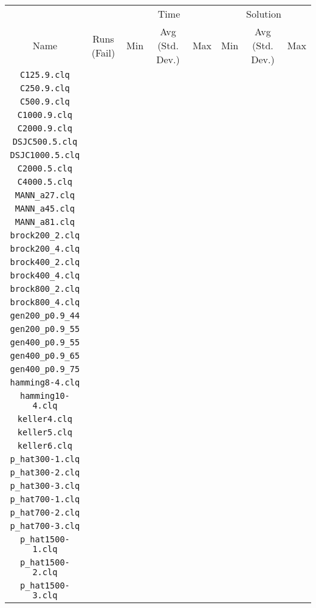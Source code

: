 %
%
\begin{tabular}[htbp]{c|c|ccc|ccc}
  &    &\multicolumn{3}{c|}{Time}&\multicolumn{3}{c}{Solution}\\
Name       &Runs (Fail)&Min&Avg (Std. Dev.)&Max&Min&Avg (Std. Dev.)&Max\\\hline
{\tt C125.9.clq}& & & & & & & \\
{\tt C250.9.clq}& & & & & & & \\
{\tt C500.9.clq}& & & & & & & \\
{\tt C1000.9.clq}& & & & & & & \\
{\tt C2000.9.clq}& & & & & & & \\
{\tt DSJC500.5.clq}& & & & & & & \\
{\tt DSJC1000.5.clq}& & & & & & & \\
{\tt C2000.5.clq}& & & & & & & \\
{\tt C4000.5.clq}& & & & & & & \\
{\tt MANN\_a27.clq}& & & & & & & \\
{\tt MANN\_a45.clq}& & & & & & & \\
{\tt MANN\_a81.clq}& & & & & & & \\
{\tt brock200\_2.clq}& & & & & & & \\
{\tt brock200\_4.clq}& & & & & & & \\
{\tt brock400\_2.clq}& & & & & & & \\
{\tt brock400\_4.clq}& & & & & & & \\
{\tt brock800\_2.clq}& & & & & & & \\
{\tt brock800\_4.clq}& & & & & & & \\
{\tt gen200\_p0.9\_44}& & & & & & & \\
{\tt gen200\_p0.9\_55}& & & & & & & \\
{\tt gen400\_p0.9\_55}& & & & & & & \\
{\tt gen400\_p0.9\_65}& & & & & & & \\
{\tt gen400\_p0.9\_75}& & & & & & & \\
{\tt hamming8-4.clq}& & & & & & & \\
{\tt hamming10-4.clq}& & & & & & & \\
{\tt keller4.clq}& & & & & & & \\
{\tt keller5.clq}& & & & & & & \\
{\tt keller6.clq}& & & & & & & \\
{\tt p\_hat300-1.clq}& & & & & & & \\
{\tt p\_hat300-2.clq}& & & & & & & \\
{\tt p\_hat300-3.clq}& & & & & & & \\
{\tt p\_hat700-1.clq}& & & & & & & \\
{\tt p\_hat700-2.clq}& & & & & & & \\
{\tt p\_hat700-3.clq}& & & & & & & \\
{\tt p\_hat1500-1.clq}& & & & & & & \\
{\tt p\_hat1500-2.clq}& & & & & & & \\
{\tt p\_hat1500-3.clq}& & & & & & & \\
\end{tabular}


